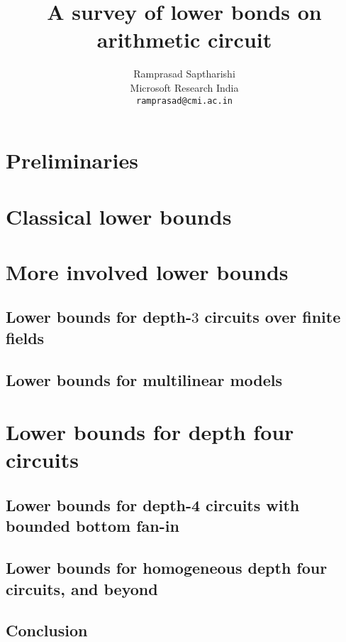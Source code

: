 \documentclass[12pt]{report}
\begin{document}
\title{A survey of lower bonds on arithmetic circuit}
\author{Ramprasad Saptharishi\\Microsoft Research India\\
{\tt ramprasad@cmi.ac.in}}
\maketitle 

\begin{abstract}
\lipsum[1-2]
\end{abstract}

\tableofcontents

\part{Preliminaries}









\part{Classical lower bounds}





\part{More involved lower bounds}

\chapter{Lower bounds for depth-$3$ circuits over finite fields}

\chapter{Lower bounds for multilinear models}

\part{Lower bounds for depth four circuits}

\chapter{Lower bounds for depth-4 circuits with bounded bottom fan-in}

\chapter{Lower bounds for homogeneous depth four circuits, and beyond}

\chapter{Conclusion}




\end{document}
